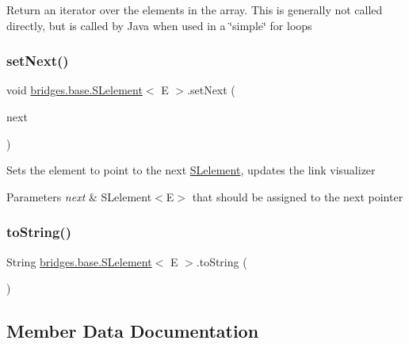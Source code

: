 Return an iterator over the elements in the array. This is generally not called directly, but is called by Java when used in a \char`\"{}simple\char`\"{} for loops \mbox{\label{classbridges_1_1base_1_1_s_lelement_afdd42f03071b2614822b73729e1a5a1a}} 
\subsubsection{\texorpdfstring{setNext()}{setNext()}}
{\footnotesize\ttfamily void \mbox{\hyperlink{classbridges_1_1base_1_1_s_lelement}{bridges.\+base.\+S\+Lelement}}$<$ E $>$.set\+Next (\begin{DoxyParamCaption}\item[{\mbox{\hyperlink{classbridges_1_1base_1_1_s_lelement}{S\+Lelement}}$<$ E $>$}]{next }\end{DoxyParamCaption})}

Sets the element to point to the next \mbox{\hyperlink{classbridges_1_1base_1_1_s_lelement}{S\+Lelement}}, updates the link visualizer


\begin{DoxyParams}{Parameters}
{\em next} & S\+Lelement$<$\+E$>$ that should be assigned to the next pointer \\
\hline
\end{DoxyParams}
\mbox{\label{classbridges_1_1base_1_1_s_lelement_af0ec4da5b29d0f5ab6ab38e91cca51f9}} 
\subsubsection{\texorpdfstring{toString()}{toString()}}
{\footnotesize\ttfamily String \mbox{\hyperlink{classbridges_1_1base_1_1_s_lelement}{bridges.\+base.\+S\+Lelement}}$<$ E $>$.to\+String (\begin{DoxyParamCaption}{ }\end{DoxyParamCaption})}



\subsection{Member Data Documentation}
\mbox{\label{classbridges_1_1base_1_1_s_lelement_abf61c96a74ad319d561c6952ea388e0e}} 
